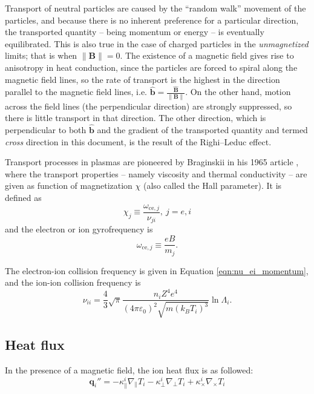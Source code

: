 Transport of neutral particles are caused by the ``random walk'' movement of the particles, and because there is no inherent preference for a particular direction, the transported quantity -- being momentum or energy
-- is eventually equilibrated. This is also true in the case of charged particles in the \textit{unmagnetized} limits; that is when $\lVert \mathbf{B} \rVert = 0$. The existence of a magnetic field gives rise to
anisotropy in heat conduction, since the particles are forced to spiral along the magnetic field lines, so the rate of transport is the highest in the direction parallel to the magnetic field lines, i.e.
$\displaystyle \mathbf{\hat{b}} = \frac{\mathbf{\hat{B}}}{\lVert \mathbf{B} \rVert}$. On the other hand, motion across the field lines (the perpendicular direction) are strongly suppressed, so there is little
transport in that direction. The other direction, which is perpendicular to both $\mathbf{\hat{b}}$ and the gradient of the transported quantity and termed \textit{cross} direction in this document, is the result of
the Righi–Leduc effect.

Transport processes in plasmas are pioneered by Braginskii in his 1965 article \cite{Braginskii}, where the transport properties -- namely viscosity and thermal conductivity -- are given as function of magnetization
$\chi$ (also called the Hall parameter). It is defined as
\begin{equation}
    \chi_j \equiv \frac{\omega_{\text{ce}, j}}{\nu_{ji}},\ j = e,i
\end{equation}
and the electron or ion gyrofrequency is
\begin{equation}
    \omega_{\text{ce}, j} \equiv \frac{eB}{m_j}.
\end{equation}

The electron-ion collision frequency is given in Equation \ref{eqn:nu_ei_momentum}, and the ion-ion collision frequency is
\begin{equation}
    \nu_{ii} = \frac{4}{3} \sqrt{\pi} \frac{n_i Z^4 e^4}{(4\pi\varepsilon_0)^2 \sqrt{m (k_B T_i)^3}} \ln\Lambda_i.
\end{equation}

\subsection{Heat flux}
In the presence of a magnetic field, the ion heat flux is as followed:
\begin{equation}
    \mathbf{q}_i'' = -\kappa^i_\parallel \nabla_\parallel T_i - \kappa^i_\perp \nabla_\perp T_i + \kappa^i_\times \nabla_\times T_i
    \label{eqn:ion_heat_flux}
\end{equation}

